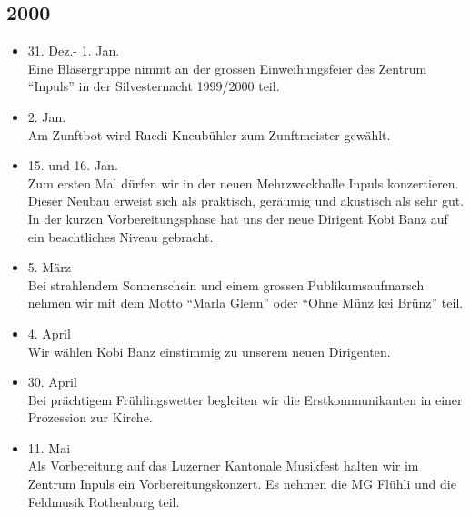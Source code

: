\subsection{2000}

\begin{history}


    \begin{itemize}

        \item 31. Dez.- 1. Jan.\\
              Eine Bläsergruppe nimmt an der grossen Einweihungsfeier des Zentrum
              \enquote{Inpuls} in der Silvesternacht 1999/2000 teil.

        \item 2. Jan.\\
              Am Zunftbot wird Ruedi Kneubühler zum Zunftmeister gewählt.

        \item 15. und 16. Jan.\\
              Zum ersten Mal dürfen wir in der neuen Mehrzweckhalle Inpuls
              konzertieren. Dieser Neubau erweist sich als praktisch, geräumig und
              akustisch als sehr gut. In der kurzen Vorbereitungsphase hat uns der
              neue Dirigent Kobi Banz auf ein beachtliches Niveau gebracht.

        \item 5. März\\
              Bei strahlendem Sonnenschein und einem grossen Publikumsaufmarsch nehmen
              wir mit dem Motto \enquote{Marla Glenn} oder \enquote{Ohne Münz kei
                  Brünz} teil.

        \item 4. April\\
              Wir wählen Kobi Banz einstimmig zu unserem neuen Dirigenten.

        \item 30. April\\
              Bei prächtigem Frühlingswetter begleiten wir die Erstkommunikanten in
              einer Prozession zur Kirche.

        \item 11. Mai\\
              Als Vorbereitung auf das Luzerner Kantonale Musikfest halten wir im
              Zentrum Inpuls ein Vorbereitungskonzert. Es nehmen die MG Flühli und die
              Feldmusik Rothenburg teil.


\end{itemize}
\end{history}
